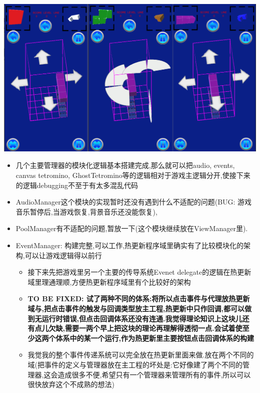 \documentclass[9pt, b5paper]{article}
\begin{document}
\includegraphics[width=.9\linewidth]{./pic/readme_20221030_162737.png}
\begin{itemize}
\item 几个主要管理器的模块化逻辑基本搭建完成,那么就可以把audio, events, canvas tetromino, GhostTetromino等的逻辑相对于游戏主逻辑分开,使接下来的逻辑debugging不至于有太多混乱代码
\item AudioManager这个模块的实现暂时还没有遇到什么不适配的问题(BUG: 游戏音乐暂停后,当游戏恢复,背景音乐还没能恢复),
\item PoolManager有不适配的问题,暂放一下(这个模块继续放在ViewManager里).
\item EventManager: 构建完整,可以工作,热更新程序域里确实有了比较模块化的架构,可以让游戏逻辑得以前行
\begin{itemize}
\item 接下来先把游戏里另一个主要的传导系统Evenet delegate的逻辑在热更新域里理通理顺,方便热更新程序域里有个比较好的架构
\item \textbf{TO BE FIXED: 试了两种不同的体系:将所以点击事件与代理放热更新域与,把点击事件的触发与回调类型放主工程,热更新中只作回调,都可以做到无运行时错误,但点击回调体系还没有连通.我觉得理论知识上这块儿还有点儿欠缺,需要一两个早上把这块的理论再理解得透彻一点.会试着使至少这两个体系中的某一个运行,作为热更新里主要按钮点击回调体系的构建}
\item 我觉我的整个事件传递系统可以完全放在热更新里面来做.放在两个不同的域(把事件的定义与管理器放在主工程的坏处是:它好像建了两个不同的管理器,这会造成很多不便,希望只有一个管理器来管理所有的事件,所以可以很快放弃这个不成熟的想法)
\end{itemize}
\end{itemize}
\end{document}
